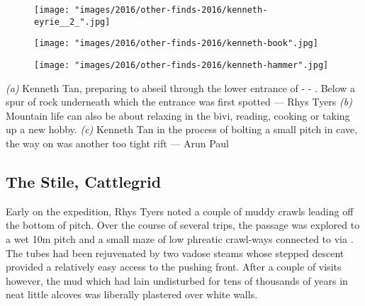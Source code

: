 \begin{pagefigure}
\checkoddpage \ifoddpage \forcerectofloat \else \forceversofloat \fi
\centering

    \begin{subfigure}[t]{0.5435\textwidth}
        \centering
        \texttt{[image: "images/2016/other-finds-2016/kenneth-eyrie\_\_2\_".jpg]} 
        \caption{} \label{moon door}
    \end{subfigure}
        \hfill
\begin{subfigure}[t]{0.4465\textwidth}
\centering
\texttt{[image: "images/2016/other-finds-2016/kenneth-book".jpg]}
 \caption{}\label{reading in the bivi}
\end{subfigure}
    \vspace{0cm}
    \begin{subfigure}[t]{\textwidth}
    \centering
        \texttt{[image: "images/2016/other-finds-2016/kenneth-hammer".jpg]} 
        \caption{} \label{hammer in B9}
    \end{subfigure}
    \caption{
    \emph{(a)}  Kenneth Tan, preparing to abseil through the lower entrance of \protect{} - \protect{} - \protect{}. Below a spur of rock underneath which the \protect{} entrance was first spotted --- Rhys Tyers
     \emph{(b)} Mountain life can also be about relaxing in the bivi, reading, cooking or taking up a new hobby.
     \emph{(c)}  Kenneth Tan in the process of bolting a small pitch in \protect{} cave, the way on was another too tight rift --- Arun Paul }
\end{pagefigure}

\subsection{The Stile, Cattlegrid}
Early on the expedition, Rhys Tyers noted a couple of muddy crawls leading off the bottom of  pitch. Over the course of several trips, the  passage was explored to a wet 10m pitch and a small maze of low phreatic crawl-ways connected to  via . The tubes had been rejuvenated by two vadose steams whose stepped descent provided a relatively easy access to the pushing front. After a couple of visits however, the mud which had lain undisturbed for tens of thousands of years in neat little alcoves was liberally plastered over white walls.

